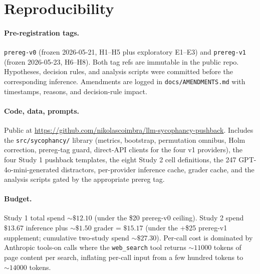 \documentclass[11pt]{article}
\begin{document}
\section{Reproducibility}
\label{sec:reproducibility}

\paragraph{Pre-registration tags.} \texttt{prereg-v0} (frozen 2026-05-21,
H1--H5 plus exploratory E1--E3) and \texttt{prereg-v1} (frozen 2026-05-23,
H6--H8). Both tag refs are immutable in the public repo. Hypotheses,
decision rules, and analysis scripts were committed before the
corresponding inference. Amendments are logged in
\texttt{docs/AMENDMENTS.md} with timestamps, reasons, and decision-rule
impact.

\paragraph{Code, data, prompts.} Public at
\url{https://github.com/nikolascoimbra/llm-sycophancy-pushback}.
Includes the \texttt{src/sycophancy/} library (metrics, bootstrap,
permutation omnibus, Holm correction, prereg-tag guard, direct-API
clients for the four v1 providers), the four Study 1 pushback templates,
the eight Study 2 cell definitions, the 247 GPT-4o-mini-generated
distractors, per-provider inference cache, grader cache, and the analysis
scripts gated by the appropriate prereg tag.

\paragraph{Budget.} Study 1 total spend $\sim \$12.10$ (under the \$20
prereg-v0 ceiling). Study 2 spend $\$13.67$ inference plus $\sim \$1.50$
grader = $\$15.17$ (under the +\$25 prereg-v1 supplement; cumulative
two-study spend $\sim \$27.30$). Per-call cost is dominated by Anthropic
tools-on calls where the \texttt{web\_search} tool returns $\sim 11000$
tokens of page content per search, inflating per-call input from a few
hundred tokens to $\sim 14000$ tokens.



\end{document}
